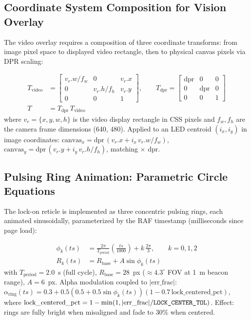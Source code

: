 \subsection{Coordinate System Composition for Vision Overlay}

The video overlay requires a composition of three coordinate transforms: from image pixel space to displayed video rectangle, then to physical canvas pixels via DPR scaling:

\begin{eqblock}
\begin{align}
T_{\text{video}} &= \begin{bmatrix} v_r.w/f_w & 0 & v_r.x \\ 0 & v_r.h/f_h & v_r.y \\ 0 & 0 & 1 \end{bmatrix},
\qquad
T_{\text{dpr}} = \begin{bmatrix} \text{dpr} & 0 & 0 \\ 0 & \text{dpr} & 0 \\ 0 & 0 & 1 \end{bmatrix} \\
T &= T_{\text{dpr}}\, T_{\text{video}}
\end{align}
where $v_r=\{x,y,w,h\}$ is the video display rectangle in CSS pixels and $f_w,f_h$ are the camera frame dimensions (640, 480). Applied to an LED centroid $(i_x,i_y)$ in image coordinates: $\text{canvas}_x = \text{dpr}\,(v_r.x + i_x\, v_r.w/f_w)$, $\text{canvas}_y = \text{dpr}\,(v_r.y + i_y\, v_r.h/f_h)$, matching  $\times$ dpr.
\end{eqblock}

\subsection{Pulsing Ring Animation: Parametric Circle Equations}

The lock-on reticle is implemented as three concentric pulsing rings, each animated sinusoidally, parameterized by the RAF timestamp  (milliseconds since page load):

\begin{eqblock}
\begin{align}
\phi_k(ts) &= \frac{2\pi}{T_{\text{period}}}\left(\frac{ts}{1000}\right) + k\,\frac{2\pi}{3}, \qquad k=0,1,2 \\
R_k(ts) &= R_{\text{base}} + A\sin\phi_k(ts)
\end{align}
with $T_{\text{period}}=2.0$~s (full cycle), $R_{\text{base}}=28$~px ($\approx4.3^\circ$ FOV at 1~m beacon range), $A=6$~px. Alpha modulation coupled to $|\text{err\_frac}|$: $\alpha_{\text{ring}}(ts) = 0.3 + 0.5(0.5+0.5\sin\phi_k(ts))(1-0.7\,\text{lock\_centered\_pct})$, where $\text{lock\_centered\_pct} = 1-\min(1, |\text{err\_frac}|/\code{LOCK\_CENTER\_TOL})$. Effect: rings are fully bright when misaligned and fade to 30\% when centered.
\end{eqblock}

